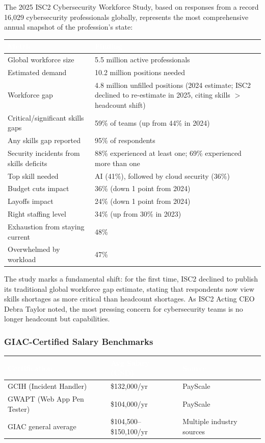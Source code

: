 \documentclass[11pt,letterpaper]{article}
\newcommand{\tableheader}[1]{\textbf{\sffamily\textcolor{white}{#1}}}
\begin{document}
The 2025 ISC2 Cybersecurity Workforce Study, based on responses from a record 16,029 cybersecurity professionals globally, represents the most comprehensive annual snapshot of the profession's state:

\begin{center}
\begin{tabularx}{\textwidth}{L{5cm}X}
\toprule
{}
\tableheader{Metric} & \tableheader{Finding} \\
\midrule
Global workforce size & 5.5 million active professionals \\
Estimated demand & 10.2 million positions needed \\
Workforce gap & 4.8 million unfilled positions (2024 estimate; ISC2 declined to re-estimate in 2025, citing skills $>$ headcount shift) \\
Critical/significant skills gaps & 59\% of teams (up from 44\% in 2024) \\
Any skills gap reported & 95\% of respondents \\
Security incidents from skills deficits & 88\% experienced at least one; 69\% experienced more than one \\
Top skill needed & AI (41\%), followed by cloud security (36\%) \\
Budget cuts impact & 36\% (down 1 point from 2024) \\
Layoffs impact & 24\% (down 1 point from 2024) \\
Right staffing level & 34\% (up from 30\% in 2023) \\
Exhaustion from staying current & 48\% \\
Overwhelmed by workload & 47\% \\
\bottomrule
\end{tabularx}
\end{center}

The study marks a fundamental shift: for the first time, ISC2 declined to publish its traditional global workforce gap estimate, stating that respondents now view skills shortages as more critical than headcount shortages. As ISC2 Acting CEO Debra Taylor noted, the most pressing concern for cybersecurity teams is no longer headcount but capabilities.

\subsubsection{GIAC-Certified Salary Benchmarks}

\begin{center}
\begin{tabularx}{\textwidth}{L{4cm}C{3cm}X}
\toprule
{}
\tableheader{Certification} & \tableheader{Avg Salary (USD)} & \tableheader{Source} \\
\midrule
GCIH (Incident Handler) & \$132,000/yr & PayScale \\
GWAPT (Web App Pen Tester) & \$104,000/yr & PayScale \\
GIAC general average & \$104,500--\$150,100/yr & Multiple industry sources \\
\bottomrule
\end{tabularx}
\end{center}
\end{document}

